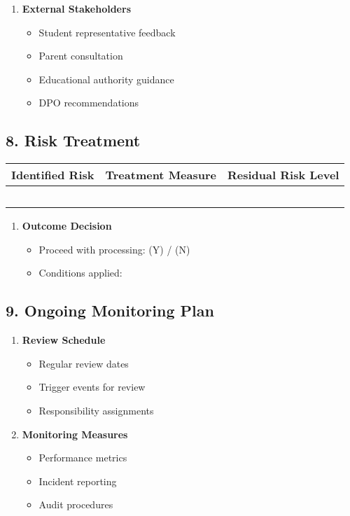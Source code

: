 \documentclass[14pt,a4paper]{article}
\begin{document}
\begin{multicols}{2}
\begin{enumerate}
    \item \textbf{External Stakeholders}
    \begin{itemize}
        \item Student representative feedback
        \item Parent consultation
        \item Educational authority guidance
        \item DPO recommendations
    \end{itemize}
\end{enumerate}
\end{multicols}

\subsection*{8. Risk Treatment}
\begin{longtable}{|p{4cm}|p{4cm}|p{4cm}|}
    \hline
    \textbf{Identified Risk} & \textbf{Treatment Measure} & \textbf{Residual Risk Level} \\
    \hline
    & & \\
    \hline
    & & \\
    \hline
    & & \\
    \hline
    & & \\
    \hline
    & & \\
    \hline
\end{longtable}


\begin{enumerate}
    \item \textbf{Outcome Decision}
    \begin{itemize}
      \item Proceed with processing: (Y) / (N)
        \item Conditions applied:
    \end{itemize}
\end{enumerate}

\vspace{0.5em}

\subsection*{9. Ongoing Monitoring Plan}
\begin{enumerate}
    \item \textbf{Review Schedule}
    \begin{itemize}
        \item Regular review dates
        \item Trigger events for review
        \item Responsibility assignments
    \end{itemize}

    \item \textbf{Monitoring Measures}
    \begin{itemize}
        \item Performance metrics
        \item Incident reporting
        \item Audit procedures
    \end{itemize}
\end{enumerate}
\end{document}

